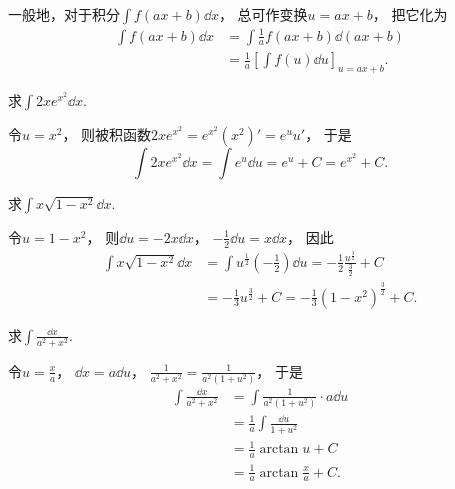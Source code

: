 \begin{remark}
一般地，对于积分\(\int f(ax+b) \dd{x}\)，
总可作变换\(u=ax+b\)，
把它化为\begin{align*}
	\int f(ax+b) \dd{x}
	&= \int \frac{1}{a} f(ax+b) \dd(ax+b) \\
	&= \frac{1}{a} \left[ \int f(u) \dd{u} \right]_{u=ax+b}.
\end{align*}
\end{remark}

\begin{example}
求\(\int 2x e^{x^2} \dd{x}\).
\begin{solution}
令\(u=x^2\)，
则被积函数\(2x e^{x^2} = e^{x^2} (x^2)' = e^u u'\)，
于是\[
	\int 2x e^{x^2} \dd{x}
	= \int e^u \dd{u}
	= e^u + C
	= e^{x^2} + C.
\]
\end{solution}
\end{example}

\begin{example}
求\(\int x \sqrt{1-x^2} \dd{x}\).
\begin{solution}
令\(u=1-x^2\)，
则\(\dd{u} = -2x\dd{x}\)，
\(-\frac{1}{2}\dd{u} = x\dd{x}\)，
因此\begin{align*}
	\int x \sqrt{1-x^2} \dd{x}
	&= \int u^{\frac{1}{2}} \left(-\frac{1}{2}\right) \dd{u}
	= -\frac{1}{2} \frac{u^{\frac{3}{2}}}{\frac{3}{2}} + C \\
	&= -\frac{1}{3} u^{\frac{3}{2}} + C
	= -\frac{1}{3} (1-x^2)^{\frac{3}{2}} + C.
\end{align*}
\end{solution}
\end{example}

\begin{example}
求\(\int \frac{\dd{x}}{a^2+x^2}\).
\begin{solution}
令\(u=\frac{x}{a}\)，
\(\dd{x}=a\dd{u}\)，
\(\frac{1}{a^2+x^2}
= \frac{1}{a^2(1+u^2)}\)，
于是\begin{align}
	\int \frac{\dd{x}}{a^2+x^2}
	&= \int \frac{1}{a^2(1+u^2)} \cdot a\dd{u}
		\nonumber \\
	&= \frac{1}{a} \int \frac{\dd{u}}{1+u^2}
		\nonumber \\
	&= \frac{1}{a} \arctan u + C
		\nonumber \\
	&= \frac{1}{a} \arctan\frac{x}{a} + C.
\end{align}
\end{solution}
\end{example}

